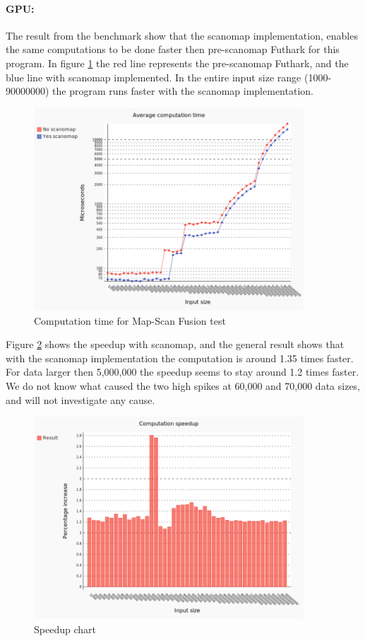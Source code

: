 \documentclass[11pt]{article}
\begin{document}
\paragraph*{GPU:} The result from the benchmark show that the scanomap implementation, enables the same computations to be done faster then pre-scanomap Futhark for this program. In figure \ref{fig:map-scan fusion test} the red line represents the pre-scanomap Futhark, and the blue line with scanomap implemented. In the entire input size range (1000-90000000) the program runs faster with the scanomap implementation.

\begin{figure}[hb]
  \centering
    \includegraphics[width=0.9\textwidth]{images/chart.png}
  \caption{Computation time for Map-Scan Fusion test}
  \label{fig:map-scan fusion test}
\end{figure}

Figure \ref{fig:map-scan fusion speedup} shows the speedup with scanomap, and the general result shows that with the scanomap implementation the computation is around 1.35 times faster. For data larger then 5,000,000 the speedup seems to stay around 1.2 times faster. We do not know what caused the two high spikes at 60,000 and 70,000 data sizes, and will not investigate any cause.

\begin{figure}[hb]
  \centering
    \includegraphics[width=0.9\textwidth]{images/comparing.png}
  \caption{Speedup chart}
  \label{fig:map-scan fusion speedup}
\end{figure}
\end{document}
